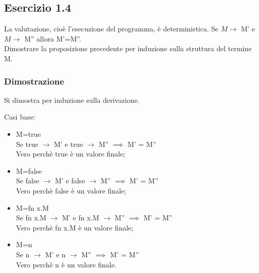 \subsection*{Esercizio 1.4}
La valutazione, cioè l’esecuzione del programma, è deterministica. Se $M \rightarrow$ M' e
$M \rightarrow$ M'' allora M'=M''.\\
Dimostrare la proposizione precedente per induzione sulla struttura del termine M.

\subsubsection*{Dimostrazione}
Si dimostra per induzione sulla derivazione.

Casi base:
\begin{itemize}
	\item M=true \\
	\indent	Se true $\rightarrow$ M' e true $\rightarrow$ M'' $\implies$ M' = M''\\
	\indent Vero perchè true è un valore finale;
	
 \item M=false \\
	\indent	Se false $\rightarrow$ M' e false $\rightarrow$ M'' $\implies$ M' = M''\\
	\indent Vero perchè false è un valore finale;

\item M=fn x.M \\
	\indent	Se fn x.M $\rightarrow$ M' e fn x.M $\rightarrow$ M'' $\implies$ M' = M''\\
	\indent Vero perchè fn x.M è un valore finale;
	\item M=n \\
	\indent	Se n $\rightarrow$ M' e n $\rightarrow$ M'' $\implies$ M' = M''\\
	\indent Vero perchè n è un valore finale.
\end{itemize}
 
